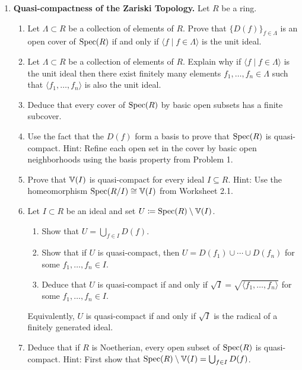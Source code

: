 \documentclass[12pt,reqno]{amsart}
\begin{document}
\begin{enumerate}[leftmargin=*, resume=problems]

\item \textbf{Quasi-compactness of the Zariski Topology.} Let $R$ be a ring.
\begin{enumerate}
	\item Let $\Lambda \subset R$ be a collection of elements of $R$. Prove that $\{D(f)\}_{f\in \Lambda}$ is an open cover of $\operatorname{Spec}(R)$ if and only if $\langle f \mid f\in \Lambda\rangle$ is the unit ideal.
	\item Let $\Lambda \subset R$ be a collection of elements of $R$. Explain why if $\langle f \mid f\in \Lambda\rangle$ is the unit ideal then there exist finitely many elements $f_{1},\ldots,f_{n} \in \Lambda$ such that $\langle f_{1},\ldots,f_{n} \rangle$ is also the unit ideal.
	\item Deduce that every cover of $\operatorname{Spec}(R)$ by basic open subsets has a finite subcover.
	\item Use the fact that the $D(f)$ form a basis to prove that $\operatorname{Spec}(R)$ is quasi-compact. Hint: Refine each open set in the cover by basic open neighborhoods using the basis property from Problem 1. 
	\item Prove that $\mathbb{V}(I)$ is quasi-compact for every ideal $I\subseteq R$. Hint: Use the homeomorphism $\operatorname{Spec}(R/I)\cong \mathbb{V}(I)$ from Worksheet 2.1.
	 \item Let $I \subset R$ be an ideal and set $U \coloneqq \operatorname{Spec}(R)\setminus \mathbb{V}(I)$.
	\begin{enumerate}
	\item Show that $U=\bigcup_{f\in I} D(f)$.
	\item Show that if $U$ is quasi-compact, then $U=D(f_1)\cup\cdots\cup D(f_n)$ for some $f_1,\ldots,f_n\in I$.
	\item Deduce that $U$ is quasi-compact if and only if $\sqrt{I}=\sqrt{\langle f_1,\ldots,f_n\rangle}$ for some $f_1,\ldots,f_n\in I$.
\end{enumerate}
Equivalently, $U$ is quasi-compact if and only if $\sqrt{I}$ is the radical of a finitely generated ideal.
	\item Deduce that if $R$ is Noetherian, every open subset of $\operatorname{Spec}(R)$ is quasi-compact. Hint: First show that $\operatorname{Spec}(R)\setminus \mathbb{V}(I)=\bigcup_{f\in I} D(f)$.
\end{enumerate}


\end{enumerate}
\end{document}
